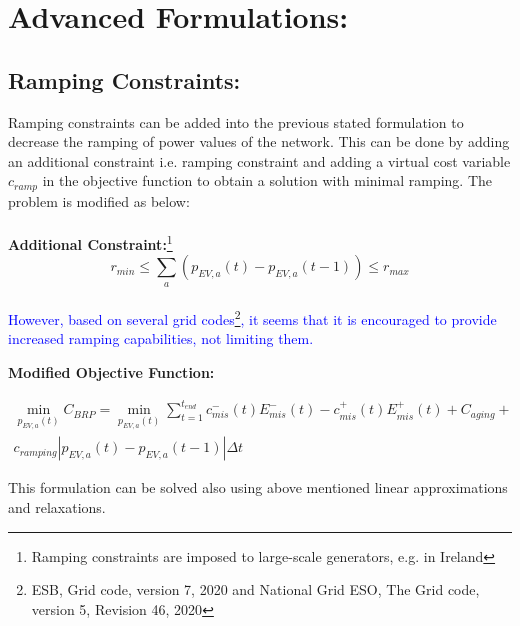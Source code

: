 \newpage

\section{Advanced Formulations:}

\subsection{Ramping Constraints:}

Ramping constraints can be added into the previous stated formulation to decrease the ramping of power values of the network. This can be done by adding an additional constraint i.e. ramping constraint and adding a virtual cost variable $c_{ramp}$ in the objective function to obtain a solution with minimal ramping. The problem is modified as below: \\ \\
\textbf{Additional Constraint:}\footnote{Ramping constraints are imposed to large-scale generators, e.g. in Ireland}
\[ 
    r_{min} \leq \sum_a(p_{EV,a}(t) - p_{EV,a}(t-1)) \leq r_{max}
\]\\

\textcolor{blue}{However, based on several grid codes\footnote{ESB, Grid code, version 7, 2020 and National Grid ESO, The Grid code, version 5, Revision 46, 2020}, it seems that it is encouraged to provide increased ramping capabilities, not limiting them.}

\textbf{Modified Objective Function:}


\begin{multline*}
\min_{p_{EV,a}(t)}C_{BRP} = \min_{ p_{EV,a}(t)}\sum_{t=1}^{t_{end}}c_{mis}^-(t)E_{mis}^-(t) - 
c_{mis}^+(t)E_{mis}^+(t)+C_{aging} +\\ c_{ramping}|p_{EV,a}(t) - p_{EV,a}(t-1)|\Delta t
\end{multline*}

This formulation can be solved also using above mentioned linear approximations and relaxations. 